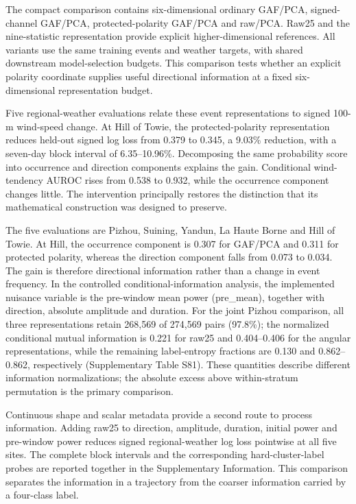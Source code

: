 \documentclass[preprint,12pt]{elsarticle}
\begin{document}
The compact comparison contains six-dimensional ordinary GAF/PCA, signed-channel GAF/PCA, protected-polarity GAF/PCA and raw/PCA. Raw25 and the nine-statistic representation provide explicit higher-dimensional references. All variants use the same training events and weather targets, with shared downstream model-selection budgets. This comparison tests whether an explicit polarity coordinate supplies useful directional information at a fixed six-dimensional representation budget.

Five regional-weather evaluations relate these event representations to signed 100-m wind-speed change. At Hill of Towie, the protected-polarity representation reduces held-out signed log loss from 0.379 to 0.345, a 9.03\% reduction, with a seven-day block interval of 6.35--10.96\%. Decomposing the same probability score into occurrence and direction components explains the gain. Conditional wind-tendency AUROC rises from 0.538 to 0.932, while the occurrence component changes little. The intervention principally restores the distinction that its mathematical construction was designed to preserve.

The five evaluations are Pizhou, Suining, Yandun, La Haute Borne and Hill of Towie. At Hill, the occurrence component is 0.307 for GAF/PCA and 0.311 for protected polarity, whereas the direction component falls from 0.073 to 0.034. The gain is therefore directional information rather than a change in event frequency. In the controlled conditional-information analysis, the implemented nuisance variable is the pre-window mean power (pre\_mean), together with direction, absolute amplitude and duration. For the joint Pizhou comparison, all three representations retain 268,569 of 274,569 pairs (97.8\%); the normalized conditional mutual information is 0.221 for raw25 and 0.404--0.406 for the angular representations, while the remaining label-entropy fractions are 0.130 and 0.862--0.862, respectively (Supplementary Table S81). These quantities describe different information normalizations; the absolute excess above within-stratum permutation is the primary comparison.

Continuous shape and scalar metadata provide a second route to process information. Adding raw25 to direction, amplitude, duration, initial power and pre-window power reduces signed regional-weather log loss pointwise at all five sites. The complete block intervals and the corresponding hard-cluster-label probes are reported together in the Supplementary Information. This comparison separates the information in a trajectory from the coarser information carried by a four-class label.
\end{document}
